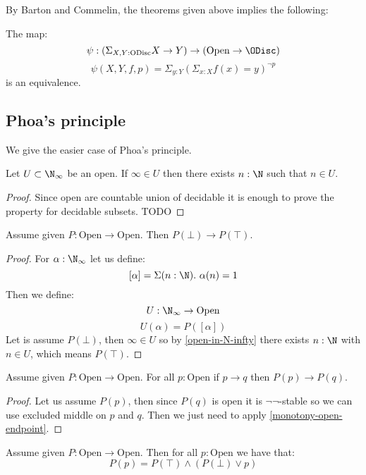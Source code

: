 By Barton and Commelin, the theorems given above implies the following:

\begin{theorem}
The map:
\[\psi: \left(\Sigma_{X,Y:\mathrm{ODisc}} X\to Y\right)  \to (\mathrm{Open}\to\ODisc)\]
\[\psi(X,Y,f,p) = \Sigma_{y:Y} (\Sigma_{x:X} f(x)=y)^{\neg p}\]
is an equivalence.
\end{theorem}

\subsection{Phoa's principle}

We give the easier case of Phoa's principle.

\begin{lemma}\label{open-in-N-infty}
Let $U\subset \N_\infty$ be an open. If $\infty\in U$ then there exists $n:\N$ such that $n\in U$.
\end{lemma}

\begin{proof}
Since open are countable union of decidable it is enough to prove the property for decidable subsets. TODO
\end{proof}

\begin{lemma}\label{monotony-open-endpoint}
Assume given $P:\mathrm{Open}\to\mathrm{Open}$. Then $P(\bot)\to P(\top)$.
\end{lemma}

\begin{proof}
For $\alpha:\N_\infty$ let us define:
\[[\alpha] = \Sigma(n:\N).\ \alpha(n)=1\]
Then we define:
\[U:\N_\infty\to\mathrm{Open}\]
\[U(\alpha) = P([\alpha])\]
Let is assume $P(\bot)$, then $\infty\in U$ so by \cref{open-in-N-infty} there exists $n:\N$ with $n\in U$, which means $P(\top)$.
\end{proof}

\begin{lemma}\label{monotony-open}
Assume given $P:\mathrm{Open}\to\mathrm{Open}$. For all $p:\mathrm{Open}$ if $p\to q$ then $P(p)\to P(q)$.
\end{lemma}

\begin{proof}
Let us assume $P(p)$, then since $P(q)$ is open it is $\neg\neg$-stable so we can use excluded middle on $p$ and $q$. Then we just need to apply \cref{monotony-open-endpoint}.
\end{proof}

\begin{lemma}
Assume given $P:\mathrm{Open}\to\mathrm{Open}$. Then for all $p:\mathrm{Open}$ we have that:
\[P(p) = P(\top)\land(P(\bot)\lor p)\]
\end{lemma}

